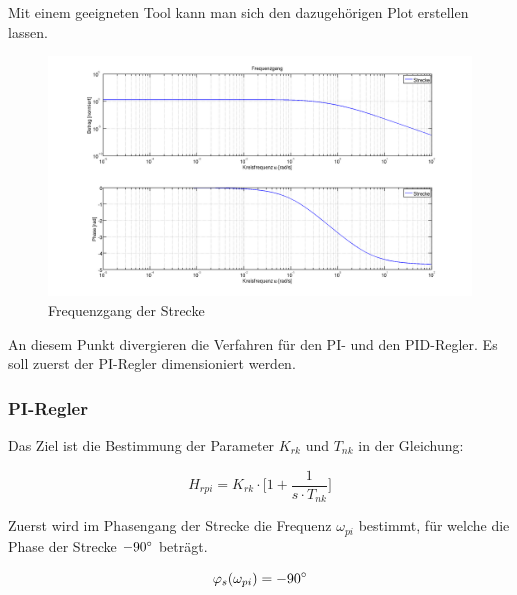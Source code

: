 Mit einem  geeigneten Tool  kann man sich  den dazugeh\"origen  Plot erstellen
lassen.

\begin{figure}[h! width=\pagewidth]
    \includegraphics[width=\textwidth]{images/streckeFrequenzgang.png}
    \caption{%
        Frequenzgang der Strecke%
    }
    \label{fig:plant_freq}
\end{figure}

An diesem Punkt divergieren die Verfahren f\"ur den PI- und den PID-Regler. Es
soll zuerst der PI-Regler dimensioniert werden.

\subsubsection*{PI-Regler}

Das  Ziel ist  die  Bestimmung  der Parameter  $K_{rk}$  und  $T_{nk}$ in  der
Gleichung:

\begin{equation} \label{eq:pi:target}
    H_{rpi} = K_{rk} \cdot \biggl[ 1 + \frac{1}{s \cdot T_{nk}} \biggr]
\end{equation}

Zuerst wird im Phasengang der Strecke die Frequenz $\omega_{pi}$ bestimmt, f\"ur
welche die Phase der Strecke $-90\degree$ betr\"agt.

\begin{equation} \label{eq:pi:phi_s}
    \varphi_s(\omega_{pi}) = -90 \degree
\end{equation}


